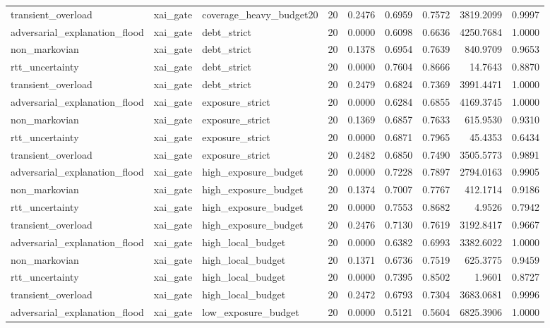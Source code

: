 \begin{table}[t]
\begin{tabular}{lllrrrrrr}
transient\_overload & xai\_gate & coverage\_heavy\_budget20 & 20 & 0.2476 & 0.6959 & 0.7572 & 3819.2099 & 0.9997 \\
adversarial\_explanation\_flood & xai\_gate & debt\_strict & 20 & 0.0000 & 0.6098 & 0.6636 & 4250.7684 & 1.0000 \\
non\_markovian & xai\_gate & debt\_strict & 20 & 0.1378 & 0.6954 & 0.7639 & 840.9709 & 0.9653 \\
rtt\_uncertainty & xai\_gate & debt\_strict & 20 & 0.0000 & 0.7604 & 0.8666 & 14.7643 & 0.8870 \\
transient\_overload & xai\_gate & debt\_strict & 20 & 0.2479 & 0.6824 & 0.7369 & 3991.4471 & 1.0000 \\
adversarial\_explanation\_flood & xai\_gate & exposure\_strict & 20 & 0.0000 & 0.6284 & 0.6855 & 4169.3745 & 1.0000 \\
non\_markovian & xai\_gate & exposure\_strict & 20 & 0.1369 & 0.6857 & 0.7633 & 615.9530 & 0.9310 \\
rtt\_uncertainty & xai\_gate & exposure\_strict & 20 & 0.0000 & 0.6871 & 0.7965 & 45.4353 & 0.6434 \\
transient\_overload & xai\_gate & exposure\_strict & 20 & 0.2482 & 0.6850 & 0.7490 & 3505.5773 & 0.9891 \\
adversarial\_explanation\_flood & xai\_gate & high\_exposure\_budget & 20 & 0.0000 & 0.7228 & 0.7897 & 2794.0163 & 0.9905 \\
non\_markovian & xai\_gate & high\_exposure\_budget & 20 & 0.1374 & 0.7007 & 0.7767 & 412.1714 & 0.9186 \\
rtt\_uncertainty & xai\_gate & high\_exposure\_budget & 20 & 0.0000 & 0.7553 & 0.8682 & 4.9526 & 0.7942 \\
transient\_overload & xai\_gate & high\_exposure\_budget & 20 & 0.2476 & 0.7130 & 0.7619 & 3192.8417 & 0.9667 \\
adversarial\_explanation\_flood & xai\_gate & high\_local\_budget & 20 & 0.0000 & 0.6382 & 0.6993 & 3382.6022 & 1.0000 \\
non\_markovian & xai\_gate & high\_local\_budget & 20 & 0.1371 & 0.6736 & 0.7519 & 625.3775 & 0.9459 \\
rtt\_uncertainty & xai\_gate & high\_local\_budget & 20 & 0.0000 & 0.7395 & 0.8502 & 1.9601 & 0.8727 \\
transient\_overload & xai\_gate & high\_local\_budget & 20 & 0.2472 & 0.6793 & 0.7304 & 3683.0681 & 0.9996 \\
adversarial\_explanation\_flood & xai\_gate & low\_exposure\_budget & 20 & 0.0000 & 0.5121 & 0.5604 & 6825.3906 & 1.0000 \\

\end{tabular}
\end{table}
